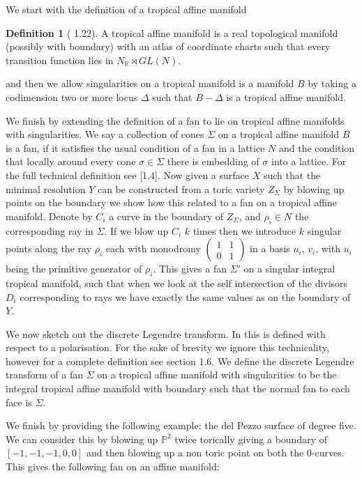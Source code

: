 \documentclass[12pt,a4paper]{book}      %
\theoremstyle{definition}
\newtheorem{dfn}[thm]{Definition}
\newcommand{\mb}[1]{\mathbb{#1}}
\begin{document}
We start with the definition of a tropical affine manifold
\begin{dfn}[\cite{GrossBook} 1.22]
A tropical affine manifold is a real topological manifold (possibly with boundary) with an atlas of coordinate charts such that every transition function lies in $N_\mb{R} \rtimes GL(N)$.
\end{dfn}
and then we allow singularities on a tropical manifold is a manifold $B$ by taking a codimension two or more locus $\Delta$ such that $B-\Delta$ is a tropical affine manifold.

We finish by extending the definition of a fan to lie on tropical affine manifolds with singularities. We say a collection of cones $\Sigma$ on a tropical affine manifold $B$ is a fan, if it satisfies the usual condition of a fan in a lattice $N$ and the condition that locally around every cone $\sigma \in \Sigma$ there is embedding of $\sigma$ into a lattice. For the full technical definition see \cite{GrossBook}[1.4]. Now given a surface $X$ such that the minimal resolution $Y$ can be constructed from a toric variety $Z_\Sigma$ by blowing up points on the boundary we show how this related to a fan on a tropical affine manifold. Denote by $C_i$ a curve in the boundary of $Z_\Sigma$, and $\rho_i \in N$ the corresponding  ray in $\Sigma$. If we blow up $C_i$ $k$ times then we introduce $k$ singular points along the ray $\rho_i$ each with monodromy $\begin{pmatrix} 1 & 1 \\ 0 & 1 \end{pmatrix}$ in a basis $u_i$, $v_i$, with $u_i$ being the primitive generator of $\rho_i$. This gives a fan $\Sigma'$ on a singular integral tropical manifold, such that when we look at the self intersection of the divisors $D_i$ corresponding to rays we have exactly the same values as on the boundary of $Y$. %

We now sketch out the discrete Legendre transform. In \cite{GrossBook} this is defined with respect to a polarisation. For the sake of brevity we ignore this technicality, however for a complete definition see \cite{GrossBook} section 1.6. We define the discrete Legendre transform of a fan $\Sigma$ on a tropical affine manifold with singularities to be the integral tropical affine manifold with boundary such that the normal fan to each face is $\Sigma$.

We finish by providing the following example: the del Pezzo surface of degree five. We can consider this by blowing up $\mb{P}^2$ twice torically giving a boundary of $[-1, -1, -1, 0,0]$ and then blowing up a non toric point on both the $0$-curves. This gives the following fan on an affine manifold:
\end{document}

